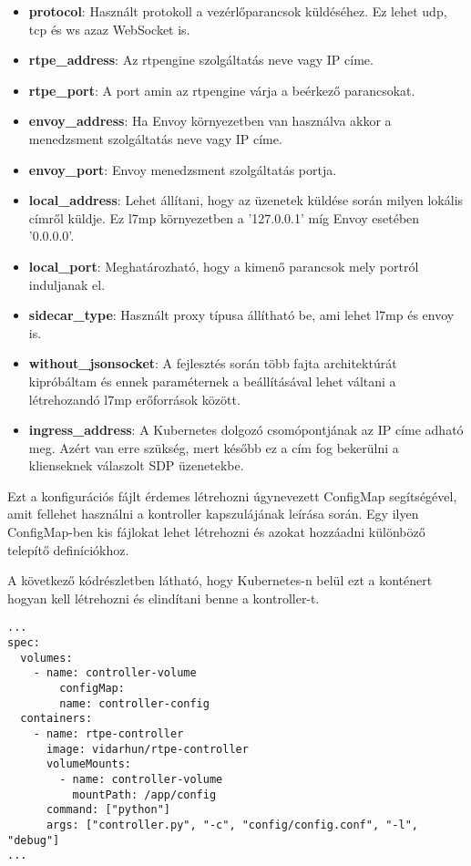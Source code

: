 \begin{itemize}
	\item \textbf{protocol}: Használt protokoll a vezérlőparancsok küldéséhez. Ez lehet
	udp, tcp és ws azaz WebSocket is.
	\item \textbf{rtpe\_address}: Az rtpengine szolgáltatás neve vagy IP címe. 
	\item \textbf{rtpe\_port}: A port amin az rtpengine várja a beérkező parancsokat. 
	\item \textbf{envoy\_address}: Ha Envoy környezetben van használva akkor a menedzsment
	szolgáltatás neve vagy IP címe. 
	\item \textbf{envoy\_port}: Envoy menedzsment szolgáltatás portja. 
	\item \textbf{local\_address}: Lehet állítani, hogy az üzenetek küldése során milyen
	lokális címről küldje. Ez l7mp környezetben a '127.0.0.1' míg Envoy esetében '0.0.0.0'.
	\item \textbf{local\_port}: Meghatározható, hogy a kimenő parancsok mely portról
	induljanak el. 
	\item \textbf{sidecar\_type}: Használt proxy típusa állítható be, ami lehet l7mp és envoy is.
	\item \textbf{without\_jsonsocket}: A fejlesztés során több fajta architektúrát kipróbáltam
	és ennek paraméternek a beállításával lehet váltani a létrehozandó l7mp erőforrások között. 
	\item \textbf{ingress\_address}: A Kubernetes dolgozó csomópontjának az IP címe adható meg.
	Azért van erre szükség, mert később ez a cím fog bekerülni a klienseknek válaszolt SDP
	üzenetekbe. 
\end{itemize}

Ezt a konfigurációs fájlt érdemes létrehozni úgynevezett ConfigMap segítségével, amit fellehet
használni a kontroller kapszulájának leírása során. Egy ilyen ConfigMap-ben kis fájlokat 
lehet létrehozni és azokat hozzáadni különböző telepítő definíciókhoz. 

A következő kódrészletben látható, hogy Kubernetes-n belül ezt a konténert hogyan kell 
létrehozni és elindítani benne a kontroller-t. 

\begin{lstlisting}
...
spec:
  volumes:
    - name: controller-volume
        configMap:
        name: controller-config
  containers:
    - name: rtpe-controller
      image: vidarhun/rtpe-controller
      volumeMounts:
        - name: controller-volume
          mountPath: /app/config
      command: ["python"]
      args: ["controller.py", "-c", "config/config.conf", "-l", "debug"]
...
\end{lstlisting}


